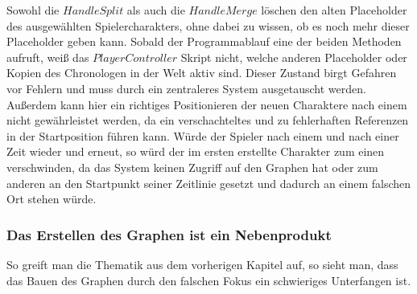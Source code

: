 Sowohl die $HandleSplit$ als auch die $HandleMerge$ löschen den alten Placeholder des ausgewählten Spielercharakters, ohne dabei zu wissen, ob es noch mehr dieser Placeholder geben kann. Sobald der Programmablauf eine der beiden Methoden aufruft, weiß das $PlayerController$ Skript nicht, welche anderen Placeholder oder Kopien des Chronologen in der Welt aktiv sind. Dieser Zustand birgt Gefahren vor Fehlern und muss durch ein zentraleres System ausgetauscht werden. Außerdem kann hier ein richtiges Positionieren der neuen Charaktere nach einem  nicht gewährleistet werden, da ein verschachteltes  und  zu fehlerhaften Referenzen in der Startposition führen kann. Würde der Spieler nach einem   und nach einer Zeit wieder  und erneut,  so würd der im ersten  erstellte Charakter zum einen verschwinden, da das System keinen Zugriff auf den Graphen hat oder zum anderen an den Startpunkt seiner Zeitlinie gesetzt und dadurch an einem falschen Ort stehen würde.

\subsubsection{Das Erstellen des Graphen ist ein Nebenprodukt}
So greift man die Thematik aus dem vorherigen Kapitel auf, so sieht man, dass das Bauen des Graphen durch den falschen Fokus ein schwieriges Unterfangen ist. 

